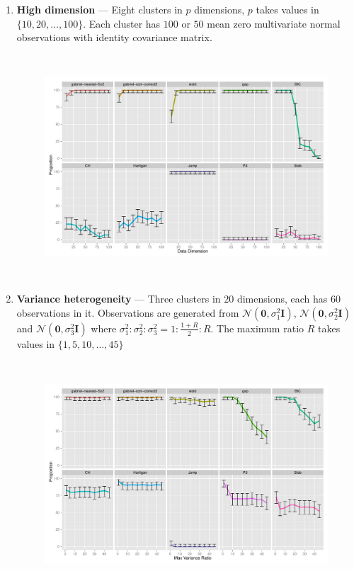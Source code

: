 \documentclass[12pt]{article}
\begin{document}
\begin{enumerate}
  \item \textbf{High dimension} --- Eight clusters in $p$ dimensions, $p$ takes values 
  	in $\{10,20,...,100\}$. Each cluster has $100$ or $50$ mean zero multivariate normal 
  	observations with identity covariance matrix. 
	
	\begin{figure}[H]
	\centering
	\includegraphics[width=5.5in, height=3.3in]{demo/bench/setting3/Facet.pdf}
	\label{fig:setting3}
	\end{figure}
	
     \item \textbf{Variance heterogeneity} --- Three clusters in $20$ dimensions, each has
     $60$ observations in it. Observations are generated from 
     $\mathcal{N}\left(\mathbf{0},\sigma_1^2\mathbf{I}\right)$,
      $\mathcal{N}\left(\mathbf{0},\sigma_2^2\mathbf{I}\right)$ and
       $\mathcal{N}\left(\mathbf{0},\sigma_3^2\mathbf{I}\right)$ where 
       $\sigma_1^2 : \sigma_2^2: \sigma_3^2 = 1:\frac{1+R}{2}:R$. The maximum ratio $R$
       takes values in $\{1,5,10,...,45\}$
	
	\begin{figure}[H]
	\centering
	\includegraphics[width=5.5in, height=3.3in]{demo/bench/setting4/Facet.pdf}
	\label{fig:setting4}
	\end{figure}
	

\end{enumerate}
\end{document}
